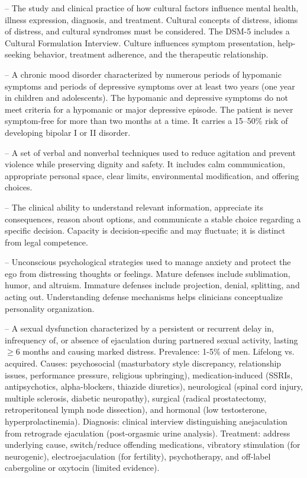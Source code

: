 -- The study and clinical practice of how cultural factors influence mental health, illness expression, diagnosis, and treatment. Cultural concepts of distress, idioms of distress, and cultural syndromes must be considered. The DSM-5 includes a Cultural Formulation Interview. Culture influences symptom presentation, help-seeking behavior, treatment adherence, and the therapeutic relationship.

-- A chronic mood disorder characterized by numerous periods of hypomanic symptoms and periods of depressive symptoms over at least two years (one year in children and adolescents). The hypomanic and depressive symptoms do not meet criteria for a hypomanic or major depressive episode. The patient is never symptom-free for more than two months at a time. It carries a 15--50\% risk of developing bipolar I or II disorder.

-- A set of verbal and nonverbal techniques used to reduce agitation and prevent violence while preserving dignity and safety. It includes calm communication, appropriate personal space, clear limits, environmental modification, and offering choices.

-- The clinical ability to understand relevant information, appreciate its consequences, reason about options, and communicate a stable choice regarding a specific decision. Capacity is decision-specific and may fluctuate; it is distinct from legal competence.

-- Unconscious psychological strategies used to manage anxiety and protect the ego from distressing thoughts or feelings. Mature defenses include sublimation, humor, and altruism. Immature defenses include projection, denial, splitting, and acting out. Understanding defense mechanisms helps clinicians conceptualize personality organization.

-- A sexual dysfunction characterized by a persistent or recurrent delay in, infrequency of, or absence of ejaculation during partnered sexual activity, lasting \(\ge\)6 months and causing marked distress. Prevalence: 1-5\% of men. Lifelong vs. acquired. Causes: psychosocial (masturbatory style discrepancy, relationship issues, performance pressure, religious upbringing), medication-induced (SSRIs, antipsychotics, alpha-blockers, thiazide diuretics), neurological (spinal cord injury, multiple sclerosis, diabetic neuropathy), surgical (radical prostatectomy, retroperitoneal lymph node dissection), and hormonal (low testosterone, hyperprolactinemia). Diagnosis: clinical interview distinguishing anejaculation from retrograde ejaculation (post-orgasmic urine analysis). Treatment: address underlying cause, switch/reduce offending medications, vibratory stimulation (for neurogenic), electroejaculation (for fertility), psychotherapy, and off-label cabergoline or oxytocin (limited evidence).

